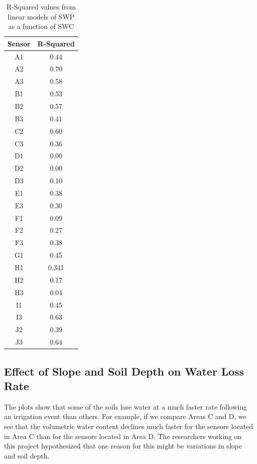 \documentclass[12pt]{scrartcl}
\begin{document}
\begin{table}[!htb]
\centering
\caption{R-Squared values from linear models of SWP as a function of SWC}
\label{tab:linear}
\begin{tabular}{@{}cc@{}}
\toprule
\textbf{Sensor} & \textbf{R-Squared} \\ \midrule
A1            & 0.44               \\
A2            & 0.70               \\
A3            & 0.58               \\
B1            & 0.53               \\
B2            & 0.57               \\
B3            & 0.41               \\
C2            & 0.60               \\
C3            & 0.36               \\
D1            & 0.00               \\
D2            & 0.00               \\
D3            & 0.10               \\
E1            & 0.38               \\
E3            & 0.30               \\
F1            & 0.09               \\
F2            & 0.27               \\
F3            & 0.38               \\
G1            & 0.45               \\
H1            & 0.341              \\
H2            & 0.17               \\
H3            & 0.04               \\
I1            & 0.45               \\
I3            & 0.63               \\
J2            & 0.39               \\
J3            & 0.64               \\ \bottomrule
\end{tabular}
\end{table}



\subsection{Effect of Slope and Soil Depth on Water Loss Rate}
The plots show that some of the soils lose water at a much faster rate following an irrigation event than others. For example, if we compare Areas C and D, we see that the volumetric water content declines much faster for the sensors located in Area C than for the sensors located in Area D. The researchers working on this project hypothesized that one reason for this might be variations in slope and soil depth.
\end{document}
